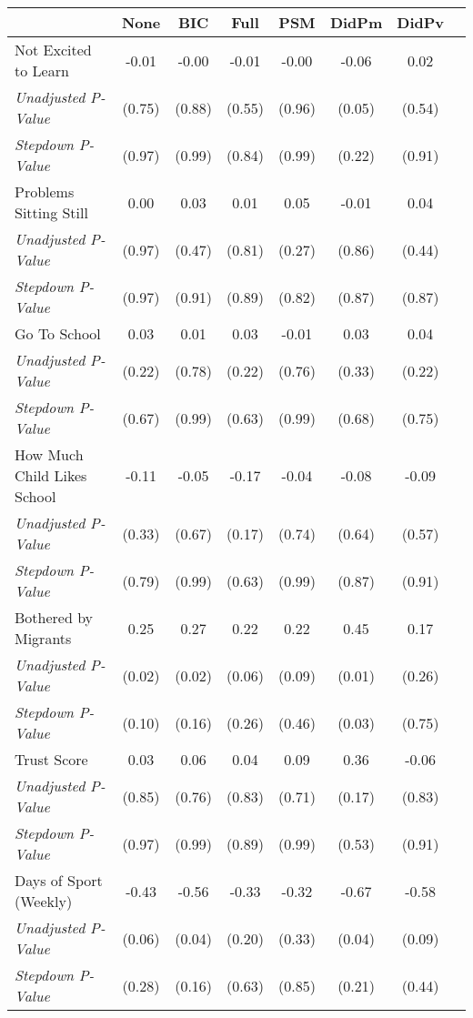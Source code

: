 \begin{tabular}{l c c c c c c c}
\toprule
 & None & BIC & Full & PSM & DidPm & DidPv \\
\midrule
Not Excited to Learn & -0.01 & -0.00 & -0.01 & -0.00 & -0.06 & 0.02 \\
\quad \textit{Unadjusted P-Value} & (0.75) & (0.88) & (0.55) & (0.96) & (0.05) & (0.54) \\
\quad \textit{Stepdown P-Value} & (0.97) & (0.99) & (0.84) & (0.99) & (0.22) & (0.91) \\
Problems Sitting Still & 0.00 & 0.03 & 0.01 & 0.05 & -0.01 & 0.04 \\
\quad \textit{Unadjusted P-Value} & (0.97) & (0.47) & (0.81) & (0.27) & (0.86) & (0.44) \\
\quad \textit{Stepdown P-Value} & (0.97) & (0.91) & (0.89) & (0.82) & (0.87) & (0.87) \\
Go To School & 0.03 & 0.01 & 0.03 & -0.01 & 0.03 & 0.04 \\
\quad \textit{Unadjusted P-Value} & (0.22) & (0.78) & (0.22) & (0.76) & (0.33) & (0.22) \\
\quad \textit{Stepdown P-Value} & (0.67) & (0.99) & (0.63) & (0.99) & (0.68) & (0.75) \\
How Much Child Likes School & -0.11 & -0.05 & -0.17 & -0.04 & -0.08 & -0.09 \\
\quad \textit{Unadjusted P-Value} & (0.33) & (0.67) & (0.17) & (0.74) & (0.64) & (0.57) \\
\quad \textit{Stepdown P-Value} & (0.79) & (0.99) & (0.63) & (0.99) & (0.87) & (0.91) \\
Bothered by Migrants & 0.25 & 0.27 & 0.22 & 0.22 & 0.45 & 0.17 \\
\quad \textit{Unadjusted P-Value} & (0.02) & (0.02) & (0.06) & (0.09) & (0.01) & (0.26) \\
\quad \textit{Stepdown P-Value} & (0.10) & (0.16) & (0.26) & (0.46) & (0.03) & (0.75) \\
Trust Score & 0.03 & 0.06 & 0.04 & 0.09 & 0.36 & -0.06 \\
\quad \textit{Unadjusted P-Value} & (0.85) & (0.76) & (0.83) & (0.71) & (0.17) & (0.83) \\
\quad \textit{Stepdown P-Value} & (0.97) & (0.99) & (0.89) & (0.99) & (0.53) & (0.91) \\
Days of Sport (Weekly) & -0.43 & -0.56 & -0.33 & -0.32 & -0.67 & -0.58 \\
\quad \textit{Unadjusted P-Value} & (0.06) & (0.04) & (0.20) & (0.33) & (0.04) & (0.09) \\
\quad \textit{Stepdown P-Value} & (0.28) & (0.16) & (0.63) & (0.85) & (0.21) & (0.44) \\
\bottomrule
\end{tabular}
